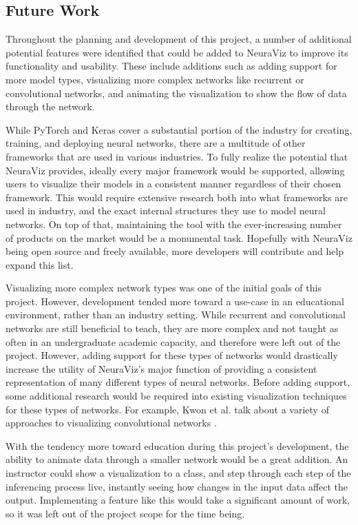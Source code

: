 \subsection{Future Work}
Throughout the planning and development of this project, a number of additional potential features were identified that could be added to NeuraViz to improve its functionality and usability. These include additions such as adding support for more model types, visualizing more complex networks like recurrent or convolutional networks, and animating the visualization to show the flow of data through the network.

While PyTorch and Keras cover a substantial portion of the industry for creating, training, and deploying neural networks, there are a multitude of other frameworks that are used in various industries. To fully realize the potential that NeuraViz provides, ideally every major framework would be supported, allowing users to visualize their models in a consistent manner regardless of their chosen framework. This would require extensive research both into what frameworks are used in industry, and the exact internal structures they use to model neural networks. On top of that, maintaining the tool with the ever-increasing number of products on the market would be a monumental task. Hopefully with NeuraViz being open source and freely available, more developers will contribute and help expand this list. 

Visualizing more complex network types was one of the initial goals of this project. However, development tended more toward a use-case in an educational environment, rather than an industry setting. While recurrent and convolutional networks are still beneficial to teach, they are more complex and not taught as often in an undergraduate academic capacity, and therefore were left out of the project. However, adding support for these types of networks would drastically increase the utility of NeuraViz's major function of providing a consistent representation of many different types of neural networks. Before adding support, some additional research would be required into existing visualization techniques for these types of networks. For example, Kwon et al. talk about a variety of approaches to visualizing convolutional networks \cite{kwon2022}.

With the tendency more toward education during this project's development, the ability to animate data through a smaller network would be a great addition. An instructor could show a visualization to a class, and step through each step of the inferencing process live, instantly seeing how changes in the input data affect the output. Implementing a feature like this would take a significant amount of work, so it was left out of the project scope for the time being.